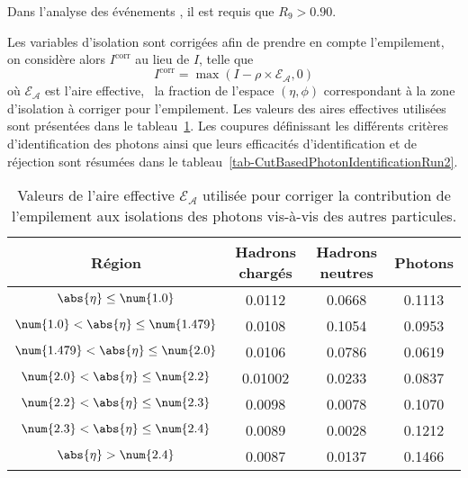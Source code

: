 Dans l'analyse des événements \Gjets, il est requis que $R_9 > \num{0.90}$.
\par Les variables d'isolation sont corrigées afin de prendre en compte l'empilement, on considère alors $I^\text{corr}$ au lieu de $I$, telle que
\begin{equation}
I^\text{corr} = \max\left( I - \rho \times \mathcal{E_A} , 0\right)
\end{equation}
où $\mathcal{E_A}$ est l'aire effective, \ie\ la fraction de l'espace $(\eta,\phi)$ correspondant à la zone d'isolation à corriger pour l'empilement. Les valeurs des aires effectives utilisées sont présentées dans le tableau~\ref{tab-CutBasedPhotonIdentificationRun2-effective_areas}.
Les coupures définissant les différents critères d'identification des photons ainsi que leurs efficacités d'identification et de réjection sont résumées dans le tableau~\ref{tab-CutBasedPhotonIdentificationRun2}.
\begin{table}[h]
\centering
\begin{tabular}{cccc}
\toprule
Région & Hadrons chargés & Hadrons neutres & Photons \\
\midrule
$\abs{\eta} \leq \num{1.0}$ & \num{0.0112} & \num{0.0668} & \num{0.1113} \\
$\num{1.0} < \abs{\eta} \leq \num{1.479}$ & \num{0.0108} & \num{0.1054} & \num{0.0953} \\
$\num{1.479} < \abs{\eta} \leq \num{2.0}$ & \num{0.0106} & \num{0.0786} & \num{0.0619} \\
$\num{2.0} < \abs{\eta} \leq \num{2.2}$ & \num{0.01002} & \num{0.0233} & \num{0.0837} \\
$\num{2.2} < \abs{\eta} \leq \num{2.3}$ & \num{0.0098} & \num{0.0078} & \num{0.1070} \\
$\num{2.3} < \abs{\eta} \leq \num{2.4}$ & \num{0.0089} & \num{0.0028} & \num{0.1212} \\
$\abs{\eta} > \num{2.4}$ & \num{0.0087} & \num{0.0137} & \num{0.1466} \\
\bottomrule
\end{tabular}
\caption[Aires effectives de correction de l'isolation du photon.]{Valeurs de l'aire effective $\mathcal{E_A}$ utilisée pour corriger la contribution de l'empilement aux isolations des photons vis-à-vis des autres particules.}
\label{tab-CutBasedPhotonIdentificationRun2-effective_areas}
\end{table}
